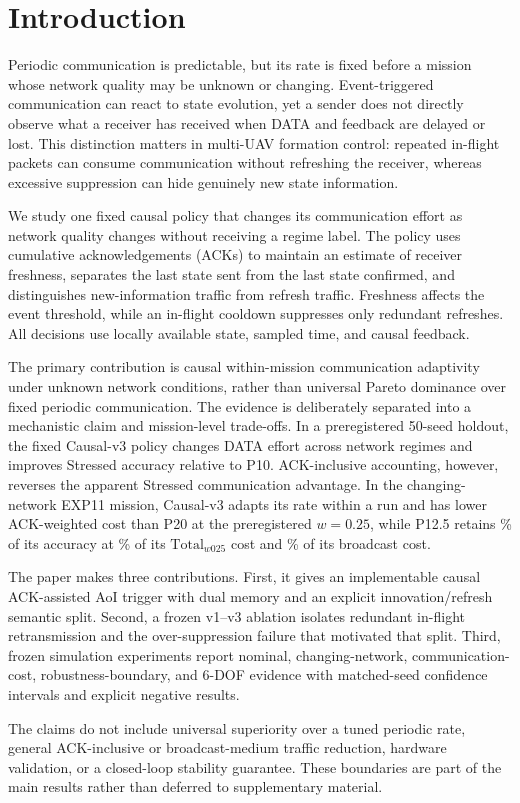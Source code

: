 \section{Introduction}
\label{sec:intro}

Periodic communication is predictable, but its rate is fixed before a
mission whose network quality may be unknown or changing. Event-triggered
communication can react to state evolution, yet a sender does not directly
observe what a receiver has received when DATA and feedback are delayed or
lost. This distinction matters in multi-UAV formation control: repeated
in-flight packets can consume communication without refreshing the receiver,
whereas excessive suppression can hide genuinely new state information.

We study one fixed causal policy that changes its communication effort as
network quality changes without receiving a regime label. The policy uses
cumulative acknowledgements (ACKs) to maintain an estimate of receiver
freshness, separates the last state sent from the last state confirmed, and
distinguishes new-information traffic from refresh traffic. Freshness affects
the event threshold, while an in-flight cooldown suppresses only redundant
refreshes. All decisions use locally available state, sampled time, and causal
feedback.

The primary contribution is causal within-mission communication adaptivity
under unknown network conditions, rather than universal Pareto dominance over
fixed periodic communication. The evidence is deliberately separated into a
mechanistic claim and mission-level trade-offs. In a preregistered 50-seed
holdout, the fixed Causal-v3 policy changes DATA effort across network regimes
and improves Stressed accuracy relative to P10. ACK-inclusive accounting,
however, reverses the apparent Stressed communication advantage. In the
changing-network EXP11 mission, Causal-v3 adapts its rate within a run and has
lower ACK-weighted cost than P20 at the preregistered $w=0.25$, while P12.5
retains \MetricElevenPonetwofiveAccuracyPercent{}\% of its accuracy at
\MetricElevenPonetwofiveCostPercent{}\% of its $\mathrm{Total}_{w025}$ cost and
\MetricElevenPonetwofiveBroadcastPercent{}\% of its broadcast cost.

The paper makes three contributions. First, it gives an implementable causal
ACK-assisted AoI trigger with dual memory and an explicit innovation/refresh
semantic split. Second, a frozen v1--v3 ablation isolates redundant in-flight
retransmission and the over-suppression failure that motivated that split.
Third, frozen simulation experiments report nominal, changing-network,
communication-cost, robustness-boundary, and 6-DOF evidence with matched-seed
confidence intervals and explicit negative results.

The claims do not include universal superiority over a tuned periodic rate,
general ACK-inclusive or broadcast-medium traffic reduction, hardware
validation, or a closed-loop stability guarantee. These boundaries are part
of the main results rather than deferred to supplementary material.
